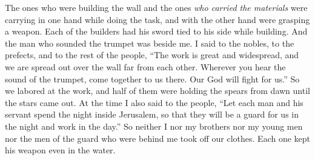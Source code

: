 \begin{biblechapter}
\verse The ones who were building the wall and the ones \textit{who carried the materials} were carrying in one hand while doing the task, and with the other hand were grasping a weapon.
\verse Each of the builders had his sword tied to his side while building. And the man who sounded the trumpet was beside me.
\verse I said to the nobles, to the prefects, and to the rest of the people, “The work is great and widespread, and we are spread out over the wall far from each other.
\verse Wherever you hear the sound of the trumpet, come together to us there. Our God will fight for us.”
\verse So we labored at the work, and half of them were holding the spears from dawn until the stars came out.
\verse At the time I also said to the people, “Let each man and his servant spend the night inside Jerusalem, so that they will be a guard for us in the night and work in the day.”
\verse So neither I nor my brothers nor my young men nor the men of the guard who were behind me took off our clothes. Each one kept his weapon even in the water.
\end{biblechapter}

